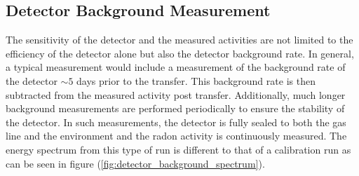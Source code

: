 \subsection{Detector Background Measurement}
\label{secsec:concentration_line}

The sensitivity of the detector and the measured activities are not limited to the efficiency of the detector alone but also the detector background rate. In general, a typical measurement would include a measurement of the background rate of the detector $\sim5$ days prior to the transfer. This background rate is then subtracted from the measured activity post transfer. Additionally, much longer background measurements are performed periodically to ensure the stability of the detector. In such measurements, the detector is fully sealed to both the gas line and the environment and the radon activity is continuously measured. The energy spectrum from this type of run is different to that of a calibration run as can be seen in figure (\ref{fig:detector_background_spectrum}).
%
